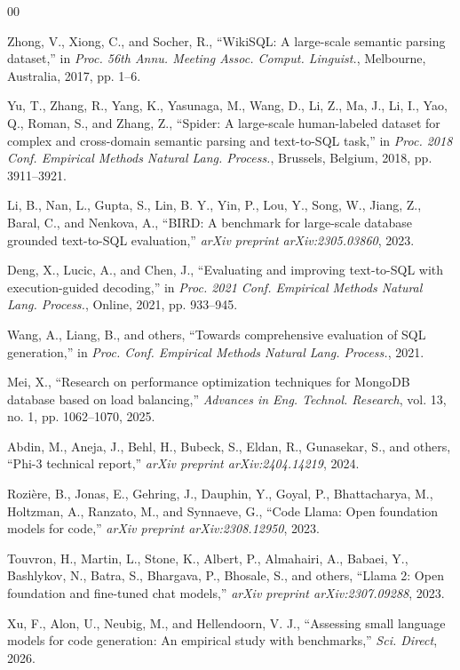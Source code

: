 \documentclass[conference]{IEEEtran}
\begin{document}
\begin{thebibliography}{00}

 Zhong, V., Xiong, C., and Socher, R., ``WikiSQL: A large-scale semantic parsing dataset,'' in \textit{Proc. 56th Annu. Meeting Assoc. Comput. Linguist.}, Melbourne, Australia, 2017, pp. 1--6.

 Yu, T., Zhang, R., Yang, K., Yasunaga, M., Wang, D., Li, Z., Ma, J., Li, I., Yao, Q., Roman, S., and Zhang, Z., ``Spider: A large-scale human-labeled dataset for complex and cross-domain semantic parsing and text-to-SQL task,'' in \textit{Proc. 2018 Conf. Empirical Methods Natural Lang. Process.}, Brussels, Belgium, 2018, pp. 3911--3921.

 Li, B., Nan, L., Gupta, S., Lin, B. Y., Yin, P., Lou, Y., Song, W., Jiang, Z., Baral, C., and Nenkova, A., ``BIRD: A benchmark for large-scale database grounded text-to-SQL evaluation,'' \textit{arXiv preprint arXiv:2305.03860}, 2023.

 Deng, X., Lucic, A., and Chen, J., ``Evaluating and improving text-to-SQL with execution-guided decoding,'' in \textit{Proc. 2021 Conf. Empirical Methods Natural Lang. Process.}, Online, 2021, pp. 933--945.

 Wang, A., Liang, B., and others, ``Towards comprehensive evaluation of SQL generation,'' in \textit{Proc. Conf. Empirical Methods Natural Lang. Process.}, 2021.

 Mei, X., ``Research on performance optimization techniques for MongoDB database based on load balancing,'' \textit{Advances in Eng. Technol. Research}, vol. 13, no. 1, pp. 1062--1070, 2025.

 Abdin, M., Aneja, J., Behl, H., Bubeck, S., Eldan, R., Gunasekar, S., and others, ``Phi-3 technical report,'' \textit{arXiv preprint arXiv:2404.14219}, 2024.

 Rozière, B., Jonas, E., Gehring, J., Dauphin, Y., Goyal, P., Bhattacharya, M., Holtzman, A., Ranzato, M., and Synnaeve, G., ``Code Llama: Open foundation models for code,'' \textit{arXiv preprint arXiv:2308.12950}, 2023.

 Touvron, H., Martin, L., Stone, K., Albert, P., Almahairi, A., Babaei, Y., Bashlykov, N., Batra, S., Bhargava, P., Bhosale, S., and others, ``Llama 2: Open foundation and fine-tuned chat models,'' \textit{arXiv preprint arXiv:2307.09288}, 2023.

 Xu, F., Alon, U., Neubig, M., and Hellendoorn, V. J., ``Assessing small language models for code generation: An empirical study with benchmarks,'' \textit{Sci. Direct}, 2026.


\end{thebibliography}
\end{document}

